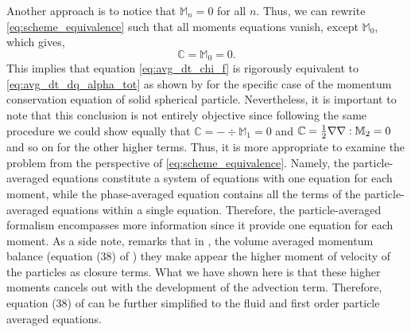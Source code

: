 Another approach is to notice that $\mathbb{M}_n=0$ for all $n$. Thus, we can rewrite \ref{eq:scheme_equivalence} such that all moments equations vanish, except $\mathbb{M}_0$, which gives, 
\begin{equation}
    \mathbb{C} = \mathbb{M}_0 = 0.
\end{equation}
This implies that equation \ref{eq:avg_dt_chi_f} is rigorously equivalent to \ref{eq:avg_dt_dq_alpha_tot} as shown by \cite[Appendix A]{nott2011suspension} for the specific case of the momentum conservation equation of solid spherical particle.
Nevertheless, it is important to note that this conclusion is not entirely objective since following the same procedure we could show equally that $\mathbb{C} = -\div\mathbb{M}_1=0$ and $\mathbb{C} = \frac{1}{2}\mathbf{\nabla}\mathbf{\nabla}:\mathbb{M}_2=0$ and so on for the other higher terms. 
Thus, it is more appropriate to examine the problem from the perspective of \ref{eq:scheme_equivalence}. 
Namely, the particle-averaged equations constitute a system of equations with one equation for each moment, while the phase-averaged equation contains all the terms of the particle-averaged equations within a single equation.
Therefore, the particle-averaged formalism encompasses more information since it provide one equation for each moment. 
As a side note, remarks that in  \citet{jackson1997locally},  the volume averaged momentum balance (equation (38) of \citet{jackson1997locally}) they make appear the higher moment of velocity of the particles as closure terms.
What we have shown here is that these higher moments cancels out with the development of the advection term. 
Therefore, equation (38) of \citet{jackson1997locally} can be further simplified to the fluid and first order particle averaged equations. 




